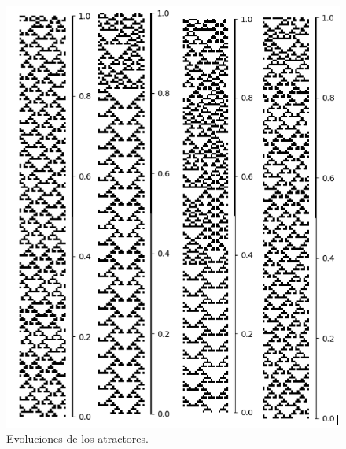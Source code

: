 \documentclass[11pt]{article}
\begin{document}
			\begin{figure}[H]
			\centering
			\includegraphics[scale=0.3]{resources/Atractores22/atractor_22_size_23_res.png}
			\caption{Evoluciones de los atractores.}\label{fig:picture}
			\end{figure}
\end{document}
